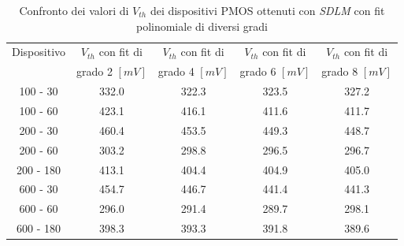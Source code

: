 \documentclass[12pt, letterpaper]{book}
\begin{document}
\begin{table}[htp] 
\renewcommand{\arraystretch}{1.3}
\caption{Confronto dei valori di $V_{th}$ dei dispositivi PMOS ottenuti con \emph{SDLM} con fit polinomiale di diversi gradi}
\label{tab:GradiSDLM} 
\begin{center}
\begin{tabular}{c c c c c}
\hline
Dispositivo &  $V_{th}$  con fit di & $V_{th}$  con fit di & $V_{th}$  con fit di & $V_{th}$  con fit di \\
 & grado 2 $[mV]$ & grado 4 $[mV]$ & grado 6 $[mV]$ & grado 8 $[mV]$ \\
\hline
100 - 30  & 332.0 & 322.3 & 323.5 & 327.2 \\
\hline
100 - 60  & 423.1 & 416.1 & 411.6 & 411.7 \\
\hline
200 - 30  & 460.4 & 453.5 & 449.3 & 448.7\\
\hline
200 - 60  & 303.2 & 298.8 & 296.5 & 296.7 \\
\hline
200 - 180 & 413.1 & 404.4 & 404.9 & 405.0 \\
\hline
600 - 30 & 454.7  & 446.7 & 441.4 & 441.3 \\
\hline
600 - 60 & 296.0 & 291.4 & 289.7 & 298.1 \\
\hline
600 - 180 & 398.3 & 393.3 & 391.8 & 389.6 \\
\hline
\end{tabular}
\end{center}
\end{table} 
\end{document}
